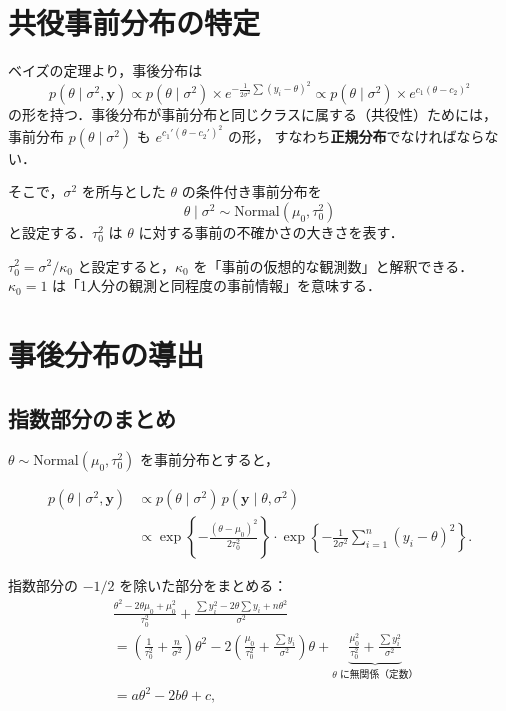 \documentclass[lualatex,ja=standard,a4paper,12pt]{bxjsarticle}
\begin{document}
\section{共役事前分布の特定}

ベイズの定理より，事後分布は
\[
  p(\theta \mid \sigma^2, \mathbf{y})
  \propto p(\theta \mid \sigma^2) \times e^{-\frac{1}{2\sigma^2}\sum(y_i - \theta)^2}
  \propto p(\theta \mid \sigma^2) \times e^{c_1(\theta - c_2)^2}
\]
の形を持つ．事後分布が事前分布と同じクラスに属する（共役性）ためには，
事前分布 $p(\theta \mid \sigma^2)$ も $e^{c_1'(\theta-c_2')^2}$ の形，
すなわち\textbf{正規分布}でなければならない．

そこで，$\sigma^2$ を所与とした $\theta$ の条件付き事前分布を
\[
  \theta \mid \sigma^2 \sim \mathrm{Normal}(\mu_0, \tau_0^2)
\]
と設定する．$\tau_0^2$ は $\theta$ に対する事前の不確かさの大きさを表す．

\begin{pointbox}
$\tau_0^2 = \sigma^2/\kappa_0$ と設定すると，$\kappa_0$ を「事前の仮想的な観測数」と解釈できる．
$\kappa_0 = 1$ は「1人分の観測と同程度の事前情報」を意味する．
\end{pointbox}


\section{事後分布の導出}

\subsection{指数部分のまとめ}

$\theta \sim \mathrm{Normal}(\mu_0, \tau_0^2)$ を事前分布とすると，

\begin{align*}
  p(\theta \mid \sigma^2, \mathbf{y})
  &\propto p(\theta \mid \sigma^2)\, p(\mathbf{y} \mid \theta, \sigma^2) \\
  &\propto \exp\!\left\{-\frac{(\theta - \mu_0)^2}{2\tau_0^2}\right\}
           \cdot \exp\!\left\{-\frac{1}{2\sigma^2}\sum_{i=1}^n (y_i - \theta)^2\right\}.
\end{align*}

指数部分の $-1/2$ を除いた部分をまとめる：
\begin{align*}
  &\frac{\theta^2 - 2\theta\mu_0 + \mu_0^2}{\tau_0^2}
   + \frac{\sum y_i^2 - 2\theta\sum y_i + n\theta^2}{\sigma^2} \\
  &= \left(\frac{1}{\tau_0^2} + \frac{n}{\sigma^2}\right)\theta^2
     - 2\left(\frac{\mu_0}{\tau_0^2} + \frac{\sum y_i}{\sigma^2}\right)\theta
     + \underbrace{\frac{\mu_0^2}{\tau_0^2} + \frac{\sum y_i^2}{\sigma^2}}_{\text{$\theta$ に無関係（定数）}} \\
  &= a\theta^2 - 2b\theta + c,
\end{align*}
\end{document}
